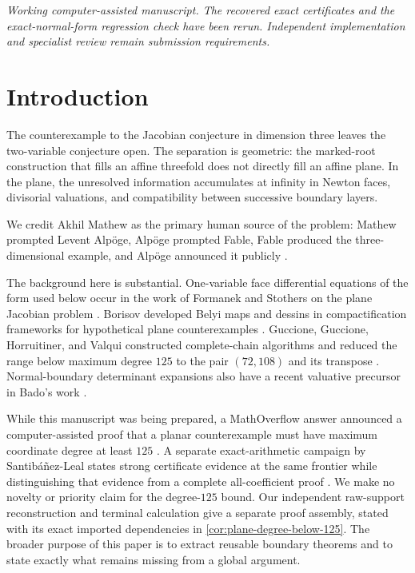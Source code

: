 \documentclass[11pt,reqno]{amsart}
\begin{document}
\maketitle

\begin{center}
\small\emph{Working computer-assisted manuscript.  The recovered exact
certificates and the exact-normal-form regression check have been rerun.
Independent implementation and specialist review remain submission
requirements.}
\end{center}

\section{Introduction}
\label{sec:introduction}

The counterexample to the Jacobian conjecture in dimension three leaves the
two-variable conjecture open.  The separation is geometric: the marked-root
construction that fills an affine threefold does not directly fill an
affine plane.  In the plane, the unresolved information accumulates at
infinity in Newton faces, divisorial valuations, and compatibility between
successive boundary layers.

We credit Akhil Mathew as the primary human source of the problem: Mathew
prompted Levent Alp\"oge, Alp\"oge prompted Fable, Fable produced the
three-dimensional example, and Alp\"oge announced it publicly
\cite{ulam2026counterexample,alpoge2026announcement}.

The background here is substantial.  One-variable face differential
equations of the form used below occur in the work of Formanek and Stothers
on the plane Jacobian problem \cite{formanek2011stothers}.  Borisov developed
Belyi maps and dessins in compactification frameworks for hypothetical
plane counterexamples \cite{borisov2009geometric}.  Guccione, Guccione,
Horruitiner, and Valqui constructed complete-chain algorithms and reduced
the range below maximum degree \(125\) to the pair \((72,108)\) and its
transpose \cite{guccioneEtAl2017algorithms,guccioneEtAl2022degree108}.
Normal-boundary determinant expansions also have a recent valuative
precursor in Bado's work \cite{bado2026valuative}.

While this manuscript was being prepared, a MathOverflow answer announced a
computer-assisted proof that a planar counterexample must have maximum
coordinate degree at least \(125\) \cite{ratto3423degree125}.  A separate
exact-arithmetic campaign by Santibáñez-Leal states strong certificate
evidence at the same frontier while distinguishing that evidence from a
complete all-coefficient proof \cite{santibanezLeal2026planar}.  We make no
novelty or priority claim for the degree-\(125\) bound.  Our
independent raw-support reconstruction and terminal calculation give a
separate proof assembly, stated with its exact imported dependencies in
\cref{cor:plane-degree-below-125}.  The broader purpose of this paper is to
extract reusable boundary theorems and to state exactly what remains missing
from a global argument.
\end{document}
